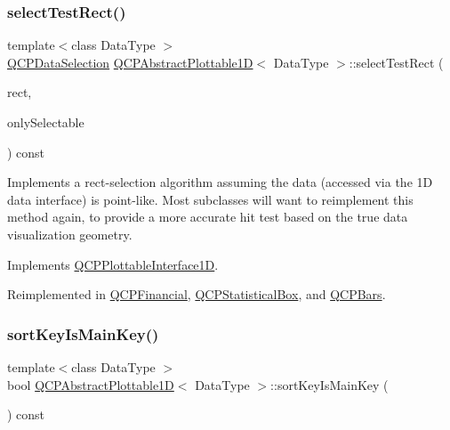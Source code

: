 \mbox{\label{classQCPAbstractPlottable1D_a22377bf6e57ab7eedbc9e489250c6ded}} 
\subsubsection{\texorpdfstring{select\+Test\+Rect()}{selectTestRect()}}
{\footnotesize\ttfamily template$<$class Data\+Type $>$ \\
\hyperlink{classQCPDataSelection}{Q\+C\+P\+Data\+Selection} \hyperlink{classQCPAbstractPlottable1D}{Q\+C\+P\+Abstract\+Plottable1D}$<$ Data\+Type $>$\+::select\+Test\+Rect (\begin{DoxyParamCaption}\item[{const Q\+RectF \&}]{rect,  }\item[{bool}]{only\+Selectable }\end{DoxyParamCaption}) const\hspace{0.3cm}{\ttfamily [virtual]}}

Implements a rect-\/selection algorithm assuming the data (accessed via the 1D data interface) is point-\/like. Most subclasses will want to reimplement this method again, to provide a more accurate hit test based on the true data visualization geometry.

Implements \hyperlink{classQCPPlottableInterface1D_a67093e4ccf490ff5f7750640941ff34c}{Q\+C\+P\+Plottable\+Interface1D}.



Reimplemented in \hyperlink{classQCPFinancial_a3c5beb1ab028a1dba845fc9dcffc7cf4}{Q\+C\+P\+Financial}, \hyperlink{classQCPStatisticalBox_a42febad6ad5e924a151434cc434b4ffc}{Q\+C\+P\+Statistical\+Box}, and \hyperlink{classQCPBars_ab03bb6125c3e983b89d694f75ce6b3d5}{Q\+C\+P\+Bars}.

\mbox{\label{classQCPAbstractPlottable1D_afe0d56e39cc076032922f059b304c092}} 
\subsubsection{\texorpdfstring{sort\+Key\+Is\+Main\+Key()}{sortKeyIsMainKey()}}
{\footnotesize\ttfamily template$<$class Data\+Type $>$ \\
bool \hyperlink{classQCPAbstractPlottable1D}{Q\+C\+P\+Abstract\+Plottable1D}$<$ Data\+Type $>$\+::sort\+Key\+Is\+Main\+Key (\begin{DoxyParamCaption}{ }\end{DoxyParamCaption}) const\hspace{0.3cm}{\ttfamily [virtual]}}





